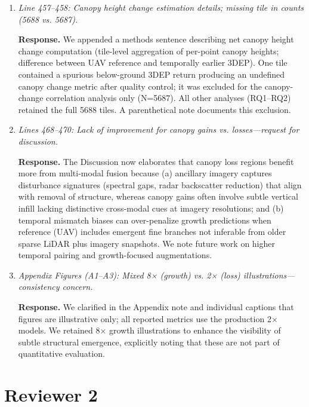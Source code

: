 \documentclass[11pt]{article}
\newcommand{\response}{\textbf{Response.} }
\begin{document}
\begin{enumerate}
  \item \emph{Line 457–458: Canopy height change estimation details; missing tile in counts (5688 vs. 5687).}

  \response We appended a methods sentence describing net canopy height change computation (tile-level aggregation of per-point canopy heights; difference between UAV reference and temporally earlier 3DEP). One tile contained a spurious below-ground 3DEP return producing an undefined canopy change metric after quality control; it was excluded for the canopy-change correlation analysis only (N=5687). All other analyses (RQ1–RQ2) retained the full 5688 tiles. A parenthetical note documents this exclusion.

  \item \emph{Lines 468–470: Lack of improvement for canopy gains vs. losses—request for discussion.}

  \response The Discussion now elaborates that canopy loss regions benefit more from multi-modal fusion because (a) ancillary imagery captures disturbance signatures (spectral gaps, radar backscatter reduction) that align with removal of structure, whereas canopy gains often involve subtle vertical infill lacking distinctive cross-modal cues at imagery resolutions; and (b) temporal mismatch biases can over-penalize growth predictions when reference (UAV) includes emergent fine branches not inferable from older sparse LiDAR plus imagery snapshots. We note future work on higher temporal pairing and growth-focused augmentations.

  \item \emph{Appendix Figures (A1–A3): Mixed 8× (growth) vs. 2× (loss) illustrations—consistency concern.}

  \response We clarified in the Appendix note and individual captions that figures are illustrative only; all reported metrics use the production 2× models. We retained 8× growth illustrations to enhance the visibility of subtle structural emergence, explicitly noting that these are not part of quantitative evaluation.

\end{enumerate}

\section*{Reviewer 2}
\end{document}

